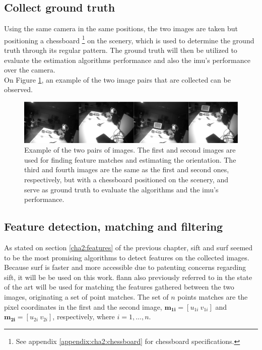 \subsection{Collect ground truth}

	Using the same camera in the same positions, the two images are taken but positioning a chessboard \footnote{See appendix \ref{appendix:cha2:chessboard} for chessboard specifications.} on the scenery, which is used to determine the ground truth through its regular pattern. The ground truth will then be utilized to evaluate the estimation algorithms performance and also the \acrshort{imu}'s performance over the camera.\\
		On Figure \ref{cha3:methodology:imagesex}, an example of the two image pairs that are collected can be observed.
	
\begin{figure}[ht]
	\centering
	\includegraphics[width=\textwidth]{images/imagesex.png}
	\caption[Example of the two pairs of images]{Example of the two pairs of images. The first and second images are used for finding feature matches and estimating the orientation. The third and fourth images are the same as the first and second ones, respectively, but with a chessboard positioned on the scenery, and serve as ground truth to evaluate the algorithms and the \acrshort{imu}'s performance.}
	\label{cha3:methodology:imagesex}
\end{figure}

\subsection{Feature detection, matching and filtering}
\label{cha3:features}

As stated on section \ref{cha2:features} of the previous chapter,
\acrshort{sift} and \acrshort{surf} seemed to be the most promising algorithms to detect features on the collected images. Because \acrshort{surf} is faster and more accessible due to patenting concerns regarding \acrshort{sift}, it will be be used on this work.
\acrshort{flann} also previously referred to in the state of the art will be used for matching the features gathered between the two images, originating a set of point matches. The set of $n$ points matches are the pixel coordinates in the first and the second image, $\mathbf{m_{1i}} = [u_{1i} \ v_{1i}]$ and $\mathbf{m_{2i}} = [u_{2i} \ v_{2i}]$, respectively, where $i=1,...,n$.

